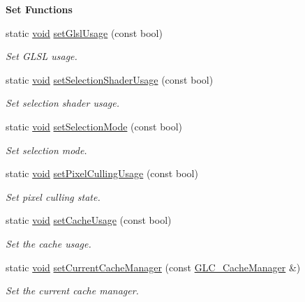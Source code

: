 \begin{Indent}{\bf Set Functions}
\begin{DoxyCompactItemize}
static \hyperlink{group___u_a_v_objects_plugin_ga444cf2ff3f0ecbe028adce838d373f5c}{void} \hyperlink{class_g_l_c___state_a6261d600e9ce9aef4cd1d78318c44ca4}{set\-Glsl\-Usage} (const bool)
\begin{DoxyCompactList}\small\item\em Set G\-L\-S\-L usage. \end{DoxyCompactList}\item 
static \hyperlink{group___u_a_v_objects_plugin_ga444cf2ff3f0ecbe028adce838d373f5c}{void} \hyperlink{class_g_l_c___state_a36472cce9422b267cd45a760c058aa3f}{set\-Selection\-Shader\-Usage} (const bool)
\begin{DoxyCompactList}\small\item\em Set selection shader usage. \end{DoxyCompactList}\item 
static \hyperlink{group___u_a_v_objects_plugin_ga444cf2ff3f0ecbe028adce838d373f5c}{void} \hyperlink{class_g_l_c___state_a993448c51569e257b1540ebe0d483021}{set\-Selection\-Mode} (const bool)
\begin{DoxyCompactList}\small\item\em Set selection mode. \end{DoxyCompactList}\item 
static \hyperlink{group___u_a_v_objects_plugin_ga444cf2ff3f0ecbe028adce838d373f5c}{void} \hyperlink{class_g_l_c___state_acf5790eeca40319bc719cfde8033b5f2}{set\-Pixel\-Culling\-Usage} (const bool)
\begin{DoxyCompactList}\small\item\em Set pixel culling state. \end{DoxyCompactList}\item 
static \hyperlink{group___u_a_v_objects_plugin_ga444cf2ff3f0ecbe028adce838d373f5c}{void} \hyperlink{class_g_l_c___state_a78f058a1105fa5827a58b4583af887ed}{set\-Cache\-Usage} (const bool)
\begin{DoxyCompactList}\small\item\em Set the cache usage. \end{DoxyCompactList}\item 
static \hyperlink{group___u_a_v_objects_plugin_ga444cf2ff3f0ecbe028adce838d373f5c}{void} \hyperlink{class_g_l_c___state_a725aefbe8aa60a22c4e4483afde000c8}{set\-Current\-Cache\-Manager} (const \hyperlink{class_g_l_c___cache_manager}{G\-L\-C\-\_\-\-Cache\-Manager} \&)
\begin{DoxyCompactList}\small\item\em Set the current cache manager. \end{DoxyCompactList}\item 

\end{DoxyCompactItemize}
\end{Indent}

